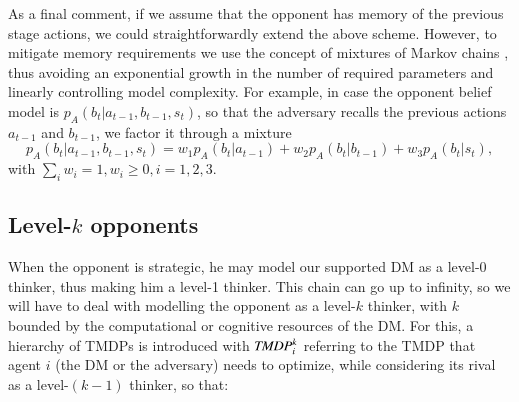 As a final comment, if we assume that the opponent has memory of the previous stage actions, we could straightforwardly extend the above scheme. However,
to mitigate memory requirements we use the concept of
mixtures of Markov chains \parencite{raftery1985model},
thus avoiding an exponential growth in 
the number of required parameters and linearly controlling 
model complexity.
For example,
in case the opponent belief model
is $p_{A}(b_t | a_{t-1}, b_{t-1}, s_t)$, so that the adversary recalls 
 the previous actions $a_{t-1}$ and $b_{t-1}$, we 
 factor it through a mixture 
\[
p_{A}(b_t | a_{t-1}, b_{t-1}, s_t) = w_1 p_{A}(b_t | a_{t-1})  + w_2 p_{A}(b_t | b_{t-1})
 + w_3 p_{A}(b_t | s_t),
 \] 
 with $\sum_i w_i = 1, w_i \geq 0, i=1,2,3$.
 
\subsection{Level-$k$ opponents}\label{sec:k}
When the opponent is
 strategic, he may model our supported DM as a level-0 thinker, thus making
 him a level-1 thinker. This chain can go up to infinity, so we will
 have to deal with modelling the opponent as a level-$k$ thinker, with $k$
 bounded by the computational or cognitive resources of the DM.
For this, a hierarchy of TMDPs is introduced with  
 $\emph{TMDP}_{i}^k$ referring
 to the TMDP that agent $i$ (the DM or the 
 adversary) needs to optimize,
 while considering its rival as a level-$(k-1)$ thinker,
 so that: 

